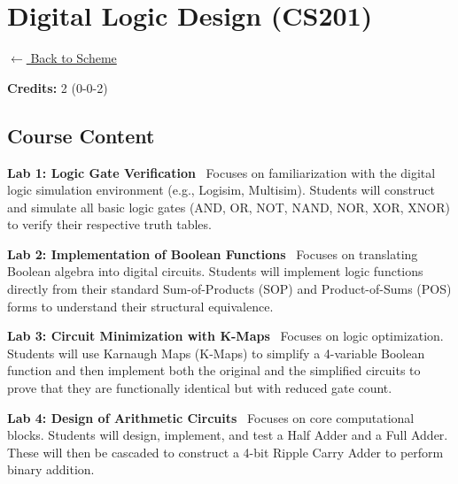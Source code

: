 \section*{Digital Logic Design (CS201)}
\label{course:CX201}

\noindent \small{\hyperref[main:scheme]{$\leftarrow$ Back to Scheme}} \vspace{0.5cm}

\noindent \textbf{Credits:} 2 (0-0-2)

\subsection*{Course Content}
\noindent\textbf{Lab 1: Logic Gate Verification} \
Focuses on familiarization with the digital logic simulation environment (e.g., Logisim, Multisim). Students will construct and simulate all basic logic gates (AND, OR, NOT, NAND, NOR, XOR, XNOR) to verify their respective truth tables. \\

\vspace{0.2cm}

\noindent\textbf{Lab 2: Implementation of Boolean Functions} \
Focuses on translating Boolean algebra into digital circuits. Students will implement logic functions directly from their standard Sum-of-Products (SOP) and Product-of-Sums (POS) forms to understand their structural equivalence. \\

\vspace{0.2cm}

\noindent\textbf{Lab 3: Circuit Minimization with K-Maps} \
Focuses on logic optimization. Students will use Karnaugh Maps (K-Maps) to simplify a 4-variable Boolean function and then implement both the original and the simplified circuits to prove that they are functionally identical but with reduced gate count. \\

\vspace{0.2cm}

\noindent\textbf{Lab 4: Design of Arithmetic Circuits} \
Focuses on core computational blocks. Students will design, implement, and test a Half Adder and a Full Adder. These will then be cascaded to construct a 4-bit Ripple Carry Adder to perform binary addition. \\

\vspace{0.2cm}

